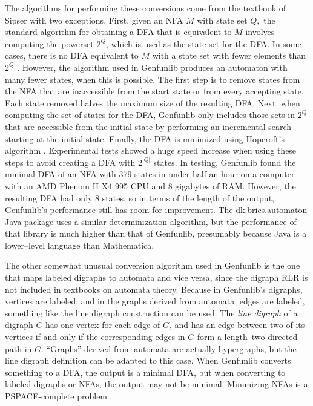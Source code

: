 \documentclass{article}
\theoremstyle{plain}
\begin{document}
The algorithms for performing these conversions come from the textbook of
Sipser \cite{sipser} with two exceptions.
First, given an NFA \( M \) with state set \( Q, \) the standard algorithm for
obtaining a DFA that is equivalent to \( M \) involves computing the powerset
\( 2^Q \), which is used as the state set for the DFA.
In some cases, there is no DFA equivalent to \( M \) with a state set with
fewer elements than \( 2^Q \) \cite{shallit2009second}.
However, the algorithm used in Genfunlib produces an automaton with many fewer
states, when this is possible.
The first step is to remove states from the NFA that are inaccessible from
the start state or from every accepting state.
Each state removed halves the maximum size of the resulting DFA.
Next, when computing the set of states for the DFA, Genfunlib only includes
those sets in \( 2^Q \) that are accessible from the initial state by performing
an incremental search starting at the initial state.
Finally, the DFA is minimized using Hopcroft's algorithm \cite{sipser}.
Experimental tests showed a huge speed increase when using these steps to
avoid creating a DFA with \( 2^{|Q|} \) states.
In testing, Genfunlib found the minimal DFA of an NFA with \( 379 \) states
in under half an hour on a computer with an AMD Phenom II X4 995 CPU and \( 8 \)
gigabytes of RAM.
However, the resulting DFA had only \( 8 \) states, so in terms of the length
of the output, Genfunlib's performance still has room for improvement.
The dk.brics.automaton Java package \cite{brics} uses a similar determinization
algorithm, but the performance of that library is much higher than that of
Genfunlib, presumably because Java is a lower--level language than Mathematica.

The other somewhat unusual conversion algorithm used in Genfunlib is the one
that maps labeled digraphs to automata and vice versa, since the digraph RLR is
not included in textbooks on automata theory.
Because in Genfunlib's digraphs, vertices are labeled, and in the graphs
derived from automata, edges are labeled, something like the line digraph
construction can be used.
The \emph{line digraph} of a digraph \( G \) has one vertex for each edge
of \( G \), and has an edge between two of its vertices if and only if the
corresponding edges in \( G \) form a length--two directed path in \( G \).
``Graphs'' derived from automata are actually hypergraphs, but the line digraph
definition can be adapted to this case.
When Genfunlib converts something to a DFA, the output is a minimal DFA, but
when converting to labeled digraphs or NFAs, the output may not be minimal.
Minimizing NFAs is a PSPACE-complete problem \cite{pspace}.
\end{document}
